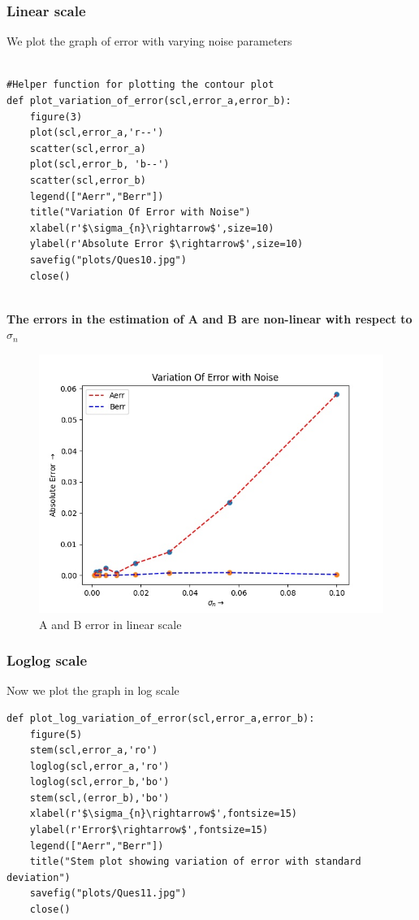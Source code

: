 \documentclass[11pt, a4paper]{article}
\begin{document}
\subsubsection{Linear scale}
We plot the graph of error with varying noise parameters
\begin{lstlisting}

#Helper function for plotting the contour plot
def plot_variation_of_error(scl,error_a,error_b):
    figure(3)
    plot(scl,error_a,'r--')
    scatter(scl,error_a)
    plot(scl,error_b, 'b--')
    scatter(scl,error_b)
    legend(["Aerr","Berr"])
    title("Variation Of Error with Noise")
    xlabel(r'$\sigma_{n}\rightarrow$',size=10)
    ylabel(r'Absolute Error $\rightarrow$',size=10)
    savefig("plots/Ques10.jpg")
    close()

\end{lstlisting}


\noindent
\\   
\textbf{The errors in the estimation of A and B are non-linear with respect to $\sigma_{n}$}

\begin{figure}
   	\centering
   	\includegraphics[scale=0.6]{plots/Ques10.jpg}  %
   	\caption{A and B error in linear scale}
   	\label{fig:A and B err in linear scale}
\end{figure}

\subsubsection{Loglog scale}
Now we plot the graph in log scale
\begin{lstlisting}
def plot_log_variation_of_error(scl,error_a,error_b):
    figure(5)
    stem(scl,error_a,'ro')
    loglog(scl,error_a,'ro')
    loglog(scl,error_b,'bo')
    stem(scl,(error_b),'bo')
    xlabel(r'$\sigma_{n}\rightarrow$',fontsize=15)
    ylabel(r'Error$\rightarrow$',fontsize=15)   
    legend(["Aerr","Berr"])
    title("Stem plot showing variation of error with standard deviation")
    savefig("plots/Ques11.jpg")
    close()
    
\end{lstlisting}
\end{document}
